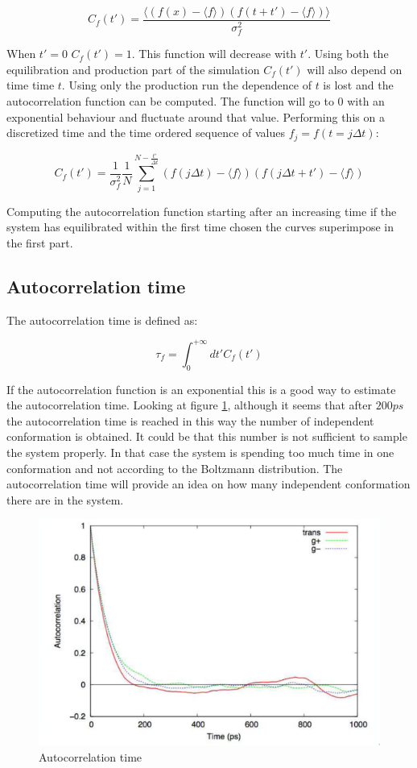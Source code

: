 	$$C_f(t') = \frac{\bigl\langle(f(x)-\langle f\rangle)(f(t+t') - \langle f\rangle)\bigr\rangle}{\sigma^2_f}$$

	When $t'=0$ $C_f(t') = 1$.
	This function will decrease with $t'$.
	Using both the equilibration and production part of the simulation $C_f(t')$ will also depend on time time $t$.
	Using only the production run the dependence of $t$ is lost and the autocorrelation function can be computed.
	The function will go to $0$ with an exponential behaviour and fluctuate around that value.
	Performing this on a discretized time and the time ordered sequence of values $f_j = f(t=j\Delta t)$:

	$$C_f(t') = \frac{1}{\sigma^2_f}\frac{1}{N}\sum\limits_{j=1}^{N-\frac{t'}{\Delta t}}(f(j\Delta t)-\langle f\rangle)(f(j\Delta t + t')-\langle f\rangle)$$

	Computing the autocorrelation function starting after an increasing time if the system has equilibrated within the first time chosen the curves superimpose in the first part.

	\subsection{Autocorrelation time}
	The autocorrelation time is defined as:

	$$\tau_f = \int_0^{+\infty} dt' C_f(t')$$

	If the autocorrelation function is an exponential this is a good way to estimate the autocorrelation time.
	Looking at figure \ref{fig:autocorrelation-time}, although it seems that after $200ps$ the autocorrelation time is reached in this way the number of independent conformation is obtained.
	It could be that this number is not sufficient to sample the system properly.
	In that case the system is spending too much time in one conformation and not according to the Boltzmann distribution.
	The autocorrelation time will provide an idea on how many independent conformation there are in the system.

	\begin{figure}[H]
		\centering
		\includegraphics[scale = 0.6]{autocorrelation-time}
		\caption{Autocorrelation time}
		\label{fig:autocorrelation-time}
	\end{figure}

